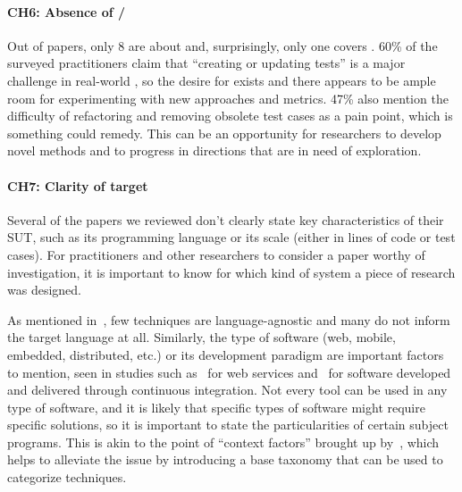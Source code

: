 
\paragraph{CH6: Absence of \tsr/\tsa}
Out of \numpapers papers, only 8 are about \tsr and, surprisingly, only one covers \tsa 
 .
60\% of the surveyed practitioners claim that ``creating or updating tests'' is a major challenge in real-world \rt, so the desire for \tsa exists and there appears to be ample room for experimenting with new approaches and metrics.
47\% also mention the difficulty of refactoring and removing obsolete test cases as a pain point, which is something \tsr could remedy.
This can be an opportunity for researchers to develop novel methods and to progress in directions that are in need of exploration.

\paragraph{CH7: Clarity of target}
Several of the papers we reviewed don't clearly state key characteristics of their SUT, such as its programming language or its scale (either in lines of code or test cases).
For practitioners and other researchers to consider a paper worthy of investigation, it is important to know for which kind of system a piece of research was designed.

As mentioned in~, few \rt techniques are language-agnostic and many do not inform the target language at all.
Similarly, the type of software (web, mobile, embedded, distributed, etc.) or its development paradigm are important factors to mention, seen in studies such as~ for web services and~ for software developed and delivered through continuous integration.
Not every tool can be used in any type of software, and it is likely that specific types of software might require specific solutions, so it is important to state the particularities of certain subject programs.
This is akin to the point of ``context factors'' brought up by~\citet{bin_ali_search_2019}, which helps to alleviate the issue by introducing a base taxonomy that can be used to categorize techniques.

